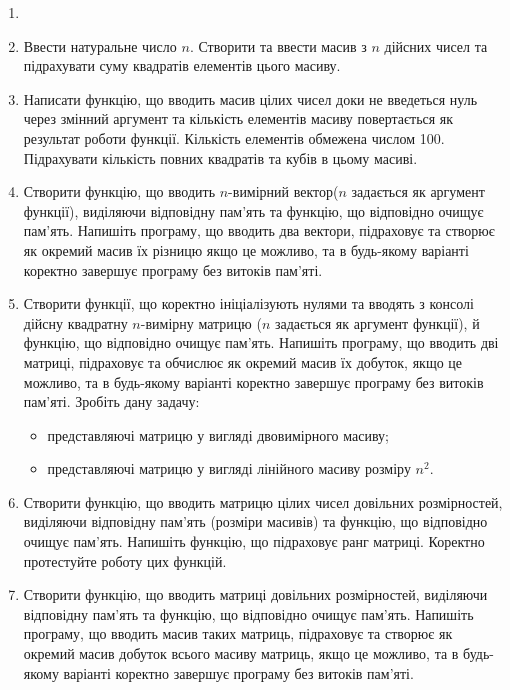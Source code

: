 \documentclass[]{article}
\begin{document}
\begin{enumerate}

\item
\item
  Ввести натуральне число $n$. Створити та ввести масив з $n$ дійсних чисел та
  підрахувати суму квадратів елементів цього масиву. 

\item
  Написати функцію, що вводить масив цілих чисел доки не введеться нуль
  через змінний аргумент та кількість елементів масиву повертається як
  результат роботи функції. Кількість елементів обмежена числом 100.
  Підрахувати кількість повних квадратів та кубів в цьому масиві.
\item
  Створити функцію, що вводить $n$-вимірний вектор($n$
  задається як аргумент функції), виділяючи відповідну
  пам'ять та функцію, що відповідно очищує пам'ять. Напишіть програму,
  що вводить два вектори, підраховує та створює як окремий масив їх
  різницю якщо це можливо, та в будь-якому варіанті коректно
  завершує програму без витоків пам'яті.
\item
  Створити функції, що коректно ініціалізують нулями та вводять з консолі 
дійсну квадратну $n$-вимірну матрицю ($n$ задається як аргумент функції), й
  функцію, що відповідно очищує пам'ять. Напишіть програму, що вводить
  дві матриці, підраховує та обчислює як окремий масив їх добуток, якщо
  це можливо, та в будь-якому варіанті коректно завершує програму без
  витоків пам'яті. Зробіть дану задачу:
  \begin{itemize}
  \item
представляючі матрицю у вигляді двовимірного масиву;
  \item
представляючі матрицю у вигляді лінійного масиву розміру $n^{2}$.
 \end{itemize}

\item
  Створити функцію, що вводить матрицю цілих чисел довільних
  розмірностей, виділяючи відповідну пам'ять (розміри масивів) та
  функцію, що відповідно очищує пам'ять. Напишіть функцію, що підраховує
  ранг матриці. Коректно протестуйте роботу цих функцій.
\item
  Створити функцію, що вводить матриці довільних розмірностей, виділяючи
  відповідну пам'ять та функцію, що відповідно очищує пам'ять. Напишіть
  програму, що вводить масив таких матриць, підраховує та створює як
  окремий масив добуток всього масиву матриць, якщо це можливо, та в
  будь-якому варіанті коректно завершує програму без витоків пам'яті.


\end{enumerate}
\end{document}
